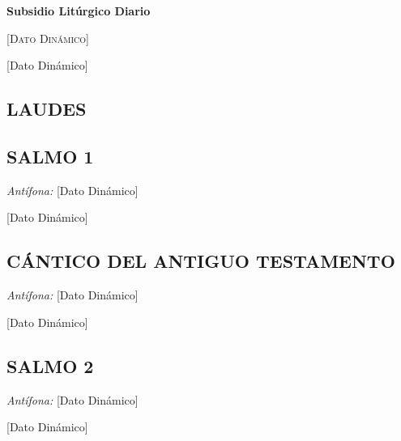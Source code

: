\documentclass[11pt, letterpaper, twoside]{article}
\newcommand{\rubrica}[1]{\textcolor{rubricred}{\small\textit{#1}}}
\DeclareRobustCommand{\VAR}[1]{[Dato Dinámico]}
\DeclareRobustCommand{\BLOCK}[1]{}
\begin{document}
\begin{center}
    {\Huge\textbf{Subsidio Litúrgico Diario}\par}
    \vspace{0.3cm}
    {\large\textsc{\VAR{dia_liturgico | escape_tex}}\par}
    {\small \VAR{fecha_texto | escape_tex}\par}
\end{center}

\vspace{0.8cm}

\begin{multicols}{2}
\RaggedRight

\BLOCK{ if laudes }
\section*{LAUDES}

\BLOCK{ if laudes.salmo1 }
\subsection*{SALMO 1}
\noindent\rubrica{Antífona:} \VAR{laudes.salmo1.antifona | escape_tex} \par\vspace{0.1cm}
\VAR{laudes.salmo1.texto | escape_tex | lettrine}
\par\vspace{0.3cm}
\BLOCK{ endif }

\BLOCK{ if laudes.cantico }
\subsection*{CÁNTICO DEL ANTIGUO TESTAMENTO}
\noindent\rubrica{Antífona:} \VAR{laudes.cantico.antifona | escape_tex} \par\vspace{0.1cm}
\VAR{laudes.cantico.texto | escape_tex | lettrine}
\par\vspace{0.3cm}
\BLOCK{ endif }

\BLOCK{ if laudes.salmo2 }
\subsection*{SALMO 2}
\noindent\rubrica{Antífona:} \VAR{laudes.salmo2.antifona | escape_tex} \par\vspace{0.1cm}
\VAR{laudes.salmo2.texto | escape_tex | lettrine}
\par\vspace{0.3cm}
\BLOCK{ endif }


\end{multicols}
\end{document}

